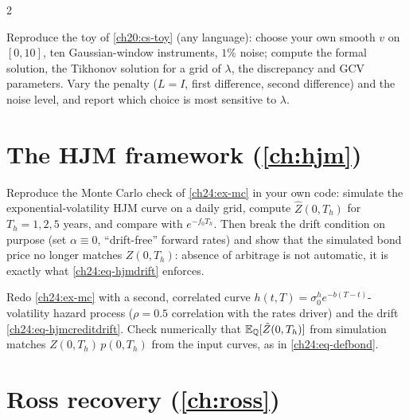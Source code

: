\begin{paracol}{2}
\begin{exercise}\label{ch20:exam-2}
Reproduce the toy of \cref{ch20:cs-toy} (any language): choose your own smooth $v$ on $[0,10]$, ten Gaussian-window instruments, $1\%$ noise; compute the formal solution, the Tikhonov solution for a grid of $\lambda$, the discrepancy and GCV parameters. Vary the penalty ($L=I$, first difference, second difference) and the noise level, and report which choice is most sensitive to $\lambda$.
\end{exercise}

\section{The HJM framework (\cref{ch:hjm})}\label{exam:ch24}

\begin{exercise}\label{ch24:ex-mccode}
Reproduce the Monte Carlo check of \cref{ch24:ex-mc} in your own code: simulate the exponential-volatility HJM curve on a daily grid, compute $\hat Z(0,T_h)$ for $T_h=1,2,5$ years, and compare with $e^{-f_0T_h}$. Then break the drift condition on purpose (set $\alpha\equiv0$, ``drift-free'' forward rates) and show that the simulated bond price no longer matches $Z(0,T_h)$: absence of arbitrage is not automatic, it is exactly what \eqref{ch24:eq-hjmdrift} enforces.
\end{exercise}

\begin{exercise}\label{ch24:ex-corr}
Redo \cref{ch24:ex-mc} with a second, correlated curve $h(t,T)=\sigma_0^he^{-b(T-t)}$-volatility hazard process ($\rho=0.5$ correlation with the rates driver) and the drift \eqref{ch24:eq-hjmcreditdrift}. Check numerically that $\mathbb{E}_{\mathbb{Q}}[\tilde Z(0,T_h)]$ from simulation matches $Z(0,T_h)\,p(0,T_h)$ from the input curves, as in \eqref{ch24:eq-defbond}.
\end{exercise}

\section{Ross recovery (\cref{ch:ross})}\label{exam:ch25}


\end{paracol}
